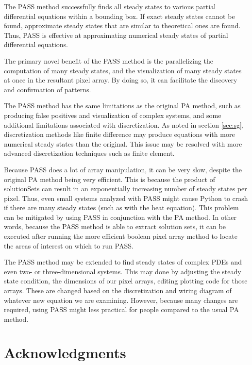 \documentclass[11pt]{article}
\begin{document}
The PASS method successfully finds all steady states to various partial differential equations within a bounding box. If exact steady states cannot be found, approximate steady states that are similar to theoretical ones are found. Thus, PASS is effective at approximating numerical steady states of partial differential equations.

The primary novel benefit of the PASS method is the parallelizing the computation of many steady states, and the visualization of many steady states at once in the resultant pixel array. By doing so, it can facilitate the discovery and confirmation of patterns.

The PASS method has the same limitations as the original PA method, such as producing false positives and visualization of complex systems, and some additional limitations associated with discretization. As noted in section \cref{sec:sg}, discretization methods like finite difference may produce equations with more numerical steady states than the original. This issue may be resolved with more advanced discretization techniques such as finite element. 

Because PASS does a lot of array manipulation, it can be very slow, despite the original PA method being very efficient. This is because the product of solutionSets can result in an exponentially increasing number of steady states per pixel. Thus, even small systems analyzed with PASS might cause Python to crash if there are many steady states (such as with the heat equation). This problem can be mitigated by using PASS in conjunction with the PA method. In other words, because the PASS method is able to extract solution sets, it can be executed after running the more efficient boolean pixel array method to locate the areas of interest on which to run PASS.

The PASS method may be extended to find steady states of complex PDEs and even two- or three-dimensional systems. This may done by adjusting the steady state condition, the dimensions of our pixel arrays, editing plotting code for those arrays. These are changed based on the discretization and wiring diagram of whatever new equation we are examining. However, because many changes are required, using PASS might less practical for people compared to the usual PA method.

\section{Acknowledgments}
\end{document}
